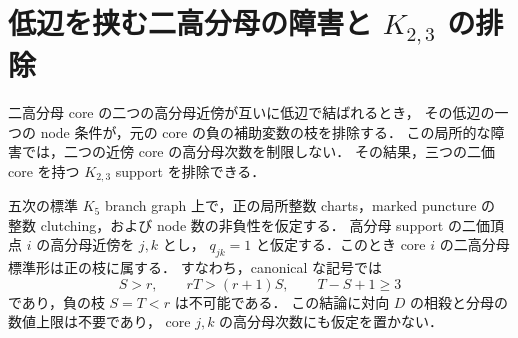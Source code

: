 \section{低辺を挟む二高分母の障害と \texorpdfstring{$K_{2,3}$}{K2,3} の排除}
\label{kb15:section}

二高分母 core の二つの高分母近傍が互いに低辺で結ばれるとき，
その低辺の一つの node 条件が，元の core の負の補助変数の枝を排除する．
この局所的な障害では，二つの近傍 core の高分母次数を制限しない．
その結果，三つの二価 core を持つ $K_{2,3}$ support を排除できる．

\begin{lemma}[二つの高分母近傍の間が低辺である場合]
\label{kb15:no-negative-low-wedge}
五次の標準 $K_5$ branch graph 上で，正の局所整数 charts，marked puncture の
整数 clutching，および node 数の非負性を仮定する．
高分母 support の二価頂点 $i$ の高分母近傍を $j,k$ とし，
$q_{jk}=1$ と仮定する．このとき core $i$ の二高分母標準形は正の枝に属する．
すなわち，canonical な記号では
\[
 S>r,\qquad rT>(r+1)S,\qquad T-S+1\geq3
\]
であり，負の枝 $S=T<r$ は不可能である．
この結論に対向 $D$ の相殺と分母の数値上限は不要であり，
core $j,k$ の高分母次数にも仮定を置かない．
\end{lemma}

